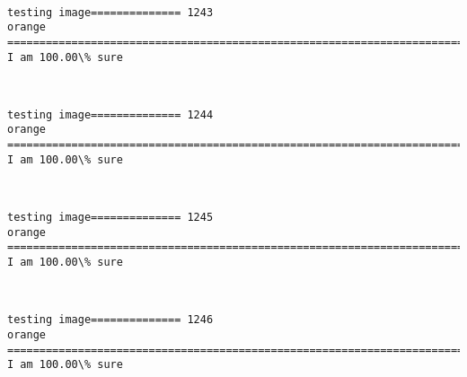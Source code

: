\documentclass[11pt]{article}
\begin{document}
    \begin{center}
    \end{center}
    { \hspace*{\fill} \\}
    
    \begin{Verbatim}[commandchars=\\\{\}]
testing image============== 1243
orange
============================================================================
I am 100.00\% sure

    \end{Verbatim}

    \begin{center}
    \end{center}
    { \hspace*{\fill} \\}
    
    \begin{Verbatim}[commandchars=\\\{\}]
testing image============== 1244
orange
============================================================================
I am 100.00\% sure

    \end{Verbatim}

    \begin{center}
    \end{center}
    { \hspace*{\fill} \\}
    
    \begin{Verbatim}[commandchars=\\\{\}]
testing image============== 1245
orange
============================================================================
I am 100.00\% sure

    \end{Verbatim}

    \begin{center}
    \end{center}
    { \hspace*{\fill} \\}
    
    \begin{Verbatim}[commandchars=\\\{\}]
testing image============== 1246
orange
============================================================================
I am 100.00\% sure

    \end{Verbatim}
\end{document}
